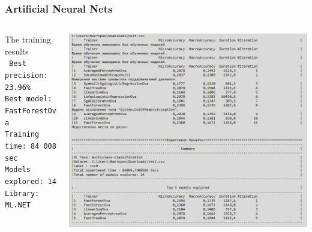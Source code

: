 \documentclass[10pt,dvipsnames]{beamer}
\begin{document}
\begin{frame}
  \frametitle{Artificial Neural Nets}
  \begin{columns}
    \begin{column}{0.3\linewidth}
      The training results\\[1em]
      \texttt{\tiny
        Best precision: 23.96\%\\
        Best model: FastForestOva\\
        Training time: 84\ 008 sec\\
        Models explored: 14\\[1em]
        Library: ML.NET
      }
    \end{column}
    \begin{column}{0.7\linewidth}
      \includegraphics[width=\linewidth]{pics/nn-set.png}
    \end{column}
  \end{columns}
\end{frame}
\end{document}

